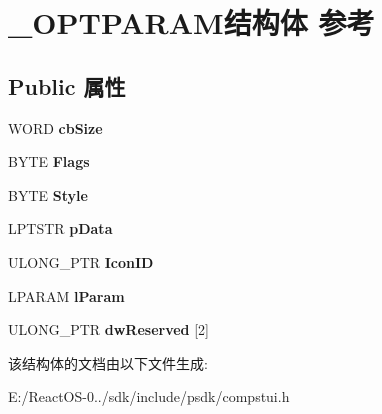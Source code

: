 \hypertarget{struct___o_p_t_p_a_r_a_m}{}\section{\+\_\+\+O\+P\+T\+P\+A\+R\+A\+M结构体 参考}
\label{struct___o_p_t_p_a_r_a_m}
\subsection*{Public 属性}
\begin{DoxyCompactItemize}
\item 
\mbox{\label{struct___o_p_t_p_a_r_a_m_a0cf0773fbaff0d6748c99327fc1b8183}} 
W\+O\+RD {\bfseries cb\+Size}
\item 
\mbox{\label{struct___o_p_t_p_a_r_a_m_a318d3993d0b72c03efc9cf499862861a}} 
B\+Y\+TE {\bfseries Flags}
\item 
\mbox{\label{struct___o_p_t_p_a_r_a_m_aecc0a93830f70137d61a81daec2961e6}} 
B\+Y\+TE {\bfseries Style}
\item 
\mbox{\label{struct___o_p_t_p_a_r_a_m_a9512fc51ca8e74585b69c817e886c517}} 
L\+P\+T\+S\+TR {\bfseries p\+Data}
\item 
\mbox{\label{struct___o_p_t_p_a_r_a_m_af807815982dfd530f296477d19369422}} 
U\+L\+O\+N\+G\+\_\+\+P\+TR {\bfseries Icon\+ID}
\item 
\mbox{\label{struct___o_p_t_p_a_r_a_m_ac63943516b4887f9360a839f594e28e5}} 
L\+P\+A\+R\+AM {\bfseries l\+Param}
\item 
\mbox{\label{struct___o_p_t_p_a_r_a_m_a2bc3815d7bc3910d7817981ed21c3f51}} 
U\+L\+O\+N\+G\+\_\+\+P\+TR {\bfseries dw\+Reserved} \mbox{[}2\mbox{]}
\end{DoxyCompactItemize}


该结构体的文档由以下文件生成\+:\begin{DoxyCompactItemize}
\item 
E\+:/\+React\+O\+S-\/0../sdk/include/psdk/compstui.\+h\end{DoxyCompactItemize}
